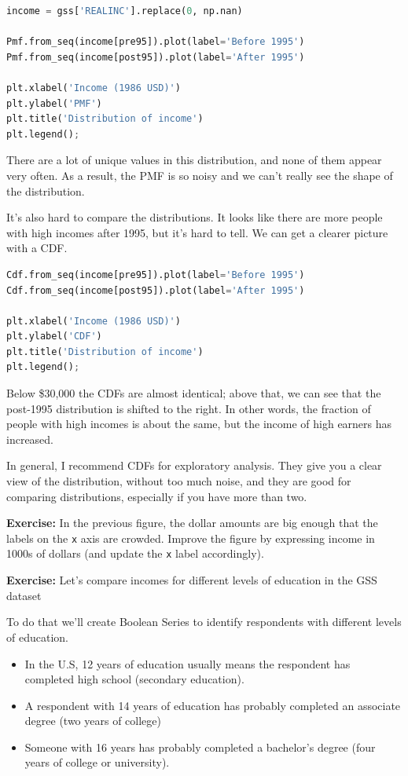 \begin{lstlisting}[language=Python,style=source]
income = gss['REALINC'].replace(0, np.nan)

Pmf.from_seq(income[pre95]).plot(label='Before 1995')
Pmf.from_seq(income[post95]).plot(label='After 1995')

plt.xlabel('Income (1986 USD)')
plt.ylabel('PMF')
plt.title('Distribution of income')
plt.legend();
\end{lstlisting}

There are a lot of unique values in this distribution, and none of them
appear very often. As a result, the PMF is so noisy and we can't really
see the shape of the distribution.

It's also hard to compare the distributions. It looks like there are
more people with high incomes after 1995, but it's hard to tell. We can
get a clearer picture with a CDF.

\begin{lstlisting}[language=Python,style=source]
Cdf.from_seq(income[pre95]).plot(label='Before 1995')
Cdf.from_seq(income[post95]).plot(label='After 1995')

plt.xlabel('Income (1986 USD)')
plt.ylabel('CDF')
plt.title('Distribution of income')
plt.legend();
\end{lstlisting}

Below \$30,000 the CDFs are almost identical; above that, we can see
that the post-1995 distribution is shifted to the right. In other words,
the fraction of people with high incomes is about the same, but the
income of high earners has increased.

In general, I recommend CDFs for exploratory analysis. They give you a
clear view of the distribution, without too much noise, and they are
good for comparing distributions, especially if you have more than two.

\textbf{Exercise:} In the previous figure, the dollar amounts are big
enough that the labels on the \passthrough{\lstinline!x!} axis are
crowded. Improve the figure by expressing income in 1000s of dollars
(and update the \passthrough{\lstinline!x!} label accordingly).

\textbf{Exercise:} Let's compare incomes for different levels of
education in the GSS dataset

To do that we'll create Boolean Series to identify respondents with
different levels of education.

\begin{itemize}
\item
  In the U.S, 12 years of education usually means the respondent has
  completed high school (secondary education).
\item
  A respondent with 14 years of education has probably completed an
  associate degree (two years of college)
\item
  Someone with 16 years has probably completed a bachelor's degree (four
  years of college or university).
\end{itemize}

